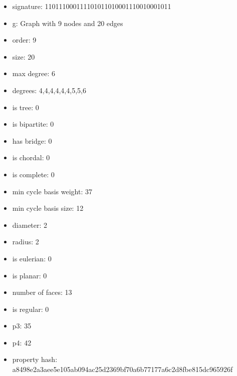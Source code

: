 \newpage
\begin{figure}
\end{figure}
\begin{itemize}
\item signature: 110111000111101011010001110010001011
\item g: Graph with 9 nodes and 20 edges
\item order: 9
\item size: 20
\item max degree: 6
\item degrees: 4,4,4,4,4,4,5,5,6
\item is tree: 0
\item is bipartite: 0
\item has bridge: 0
\item is chordal: 0
\item is complete: 0
\item min cycle basis weight: 37
\item min cycle basis size: 12
\item diameter: 2
\item radius: 2
\item is eulerian: 0
\item is planar: 0
\item number of faces: 13
\item is regular: 0
\item p3: 35
\item p4: 42
\item property hash: a8498e2a3aee5e105ab094ac25d2369bf70a6b77177a6c2d8fbe815dc965926f
\end{itemize}
